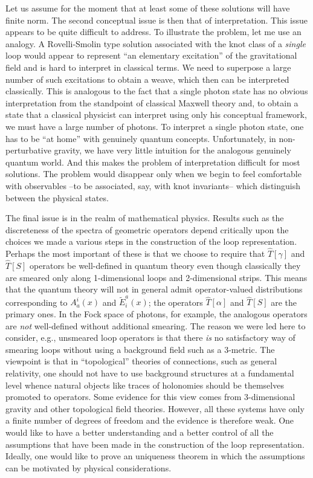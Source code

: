 Let us assume for the moment that at least some of these solutions will have
finite norm. The second conceptual issue is then that of interpretation.
This issue appears to be quite difficult to address.  To illustrate the
problem, let me use an analogy. A Rovelli-Smolin type solution associated
with the knot class of a {\it single} loop would appear to represent ``an
elementary excitation'' of the gravitational field and is hard to interpret
in classical terms. We need to superpose a large number of such excitations
to obtain a weave, which then can be interpreted classically. This is
analogous to the fact that a single photon state has no obvious interpretation
from the standpoint of classical Maxwell theory and, to obtain a state that a
classical physicist can interpret using only his conceptual framework, we must
have a large number of photons. To interpret a single photon state, one has to
be ``at home'' with genuinely quantum concepts. Unfortunately, in
non-perturbative gravity, we have very little intuition for the analogous
genuinely quantum world.  And this makes the problem of interpretation
difficult for most solutions.  The problem would disappear only when we begin
to feel comfortable with observables --to be associated, say, with knot
invariants-- which distinguish between the physical states.

The final issue is in the realm of mathematical physics.  Results such as the
discreteness of the spectra of geometric operators depend critically upon the
choices we made a various steps in the construction of the loop representation.
Perhaps the most important of these is that we choose to require that $\hat
T[\gamma]$ and $\hat T[S]$ operators be well-defined in quantum theory even
though classically they are smeared only along 1-dimensional loops and
2-dimensional strips.  This means that the quantum theory will not in general
admit operator-valued distributions corresponding to $A^i_a(x)$ and $\tilde
E^a_i(x)$; the operators $\hat T[\alpha]$ and $\hat T[S]$ are the primary ones.
In the Fock space of photons, for example, the analogous operators are {\it
not} well-defined without additional smearing.  The reason we were led here to
consider, e.g., unsmeared loop operators is that there {\it is} no satisfactory
way of smearing loops without using a background field such as a 3-metric. The
viewpoint is that in ``topological'' theories of connections, such as general
relativity, one should not have to use background structures at a fundamental
level whence natural objects like traces of holonomies should be themselves
promoted to operators.  Some evidence for this view comes from 3-dimensional
gravity and other topological field theories.  However, all these systems have
only a finite number of degrees of freedom and the evidence is therefore weak.
One would like to have a better understanding and a better control of all the
assumptions that have been made in the construction of the loop representation.
Ideally, one would like to prove an uniqueness theorem in which the assumptions
can be motivated by physical considerations.

